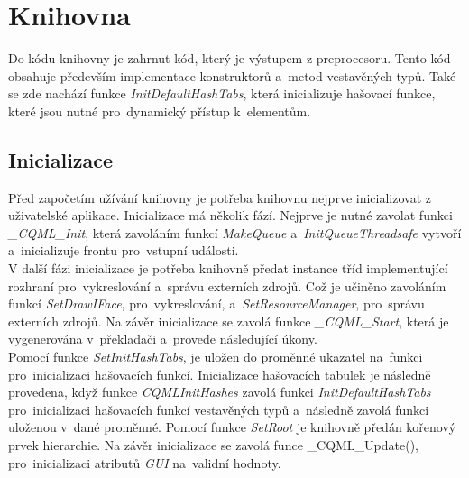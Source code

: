 \documentclass[11pt,twoside,a4paper]{book}
\begin{document}
\section{\label{SEC:aa}Knihovna}
Do kódu knihovny je zahrnut kód, který je výstupem z preprocesoru. Tento kód obsahuje především implementace konstruktorů a~metod vestavěných typů. Také se zde nachází funkce \textit{InitDefaultHashTabs}, která inicializuje hašovací funkce, které jsou nutné pro~dynamický přístup k~elementům.
\subsection{Inicializace}
Před započetím užívání knihovny je potřeba knihovnu nejprve inicializovat z uživatelské aplikace. Inicializace má několik fází. Nejprve je nutné zavolat funkci \textit{\_CQML\_Init}, která zavoláním funkcí \textit{MakeQueue} a~\textit{InitQueueThreadsafe} vytvoří a~inicializuje frontu pro~vstupní události.\\
V další fázi inicializace je potřeba knihovně předat instance tříd implementující rozhraní pro~vykreslování a~správu externích zdrojů. Což je učiněno zavoláním funkcí \textit{SetDrawIFace}, pro~vykreslování, a~\textit{SetResourceManager}, pro~správu externích zdrojů. Na závěr inicializace se zavolá funkce \textit{\_CQML\_Start}, která je vygenerována v~překladači a~provede následující úkony.\\
Pomocí funkce \textit{SetInitHashTabs}, je uložen do proměnné ukazatel na~funkci pro~inicializaci hašovacích funkcí. Inicializace hašovacích tabulek je následně provedena, když funkce \textit{CQMLInitHashes} zavolá funkci \textit{InitDefaultHashTabs} pro~inicializaci hašovacích funkcí vestavěných typů a~následně zavolá funkci uloženou v~dané proměnné. Pomocí funkce \textit{SetRoot} je knihovně předán kořenový prvek hierarchie. Na závěr inicializace se zavolá funce \_CQML\_Update(), pro~inicializaci atributů \textit{GUI} na~validní hodnoty.	
\end{document}
